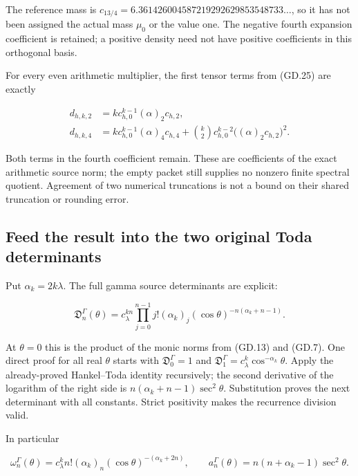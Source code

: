 The reference mass is
\(c_{13/4}=6.361426004587219292629853548733\ldots\), so it has not been
assigned the actual mass \(\mu_0\) or the value one. The negative fourth
expansion coefficient is retained; a positive density need not have
positive coefficients in this orthogonal basis.

For every even arithmetic multiplier, the first tensor terms from (GD.25)
are exactly

\[
\begin{aligned}
d_{h,k,2}&=k c_{h,0}^{k-1}(\alpha)_2c_{h,2},\\
d_{h,k,4}&=k c_{h,0}^{k-1}(\alpha)_4c_{h,4}
 +\binom{k}{2}c_{h,0}^{k-2}\bigl((\alpha)_2c_{h,2}\bigr)^2.
\end{aligned}
\]

Both terms in the fourth coefficient remain. These are coefficients of
the exact arithmetic source norm; the empty packet still supplies no
nonzero finite spectral quotient. Agreement of two numerical truncations
is not a bound on their shared truncation or rounding error.

\subsection[\hspace{0.4em}Feed the result into the two original Toda
determinants]{Feed the result into the two original Toda
determinants}\label{gammad-feed-the-result-into-the-two-original-toda-determinants}

Put \(\alpha_k=2k\lambda\). The full gamma source determinants are
explicit:

\[
\boxed{
\mathfrak D_n^\Gamma(\theta)
=c_\lambda^{kn}
\prod_{j=0}^{n-1}j!(\alpha_k)_j
(\cos\theta)^{-n(\alpha_k+n-1)}.
}                                                                   \tag{GD.28}
\]

At \(\theta=0\) this is the product of the monic norms from (GD.13) and
(GD.7). One direct proof for all real \(\theta\) starts with
\(\mathfrak D_0^\Gamma=1\) and
\(\mathfrak D_1^\Gamma=c_\lambda^k\cos^{-\alpha_k}\theta\). Apply the
already-proved Hankel--Toda identity recursively; the second derivative
of the logarithm of the right side is \(n(\alpha_k+n-1)\sec^2\theta\).
Substitution proves the next determinant with all constants. Strict
positivity makes the recurrence division valid.

In particular

\[
\omega_n^\Gamma(\theta)
=c_\lambda^k n!(\alpha_k)_n(\cos\theta)^{-(\alpha_k+2n)},\qquad
 a_n^\Gamma(\theta)=n(n+\alpha_k-1)\sec^2\theta.                     \tag{GD.29}
\]

